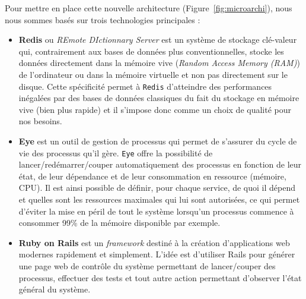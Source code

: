 Pour mettre en place cette nouvelle architecture (Figure~\ref{fig:microarchi}), nous nous sommes basés sur trois technologies principales :
\begin{itemize}
\item \textbf{Redis}\cite{redis} ou \emph{REmote DIctionnary Server} est un système de stockage clé-valeur qui, contrairement aux bases de données plus conventionnelles, stocke les données directement dans la mémoire vive (\emph{Random Access Memory (RAM)}) de l'ordinateur ou dans la mémoire virtuelle et non pas directement sur le disque. Cette spécificité permet à \texttt{Redis} d'atteindre des performances inégalées par des bases de données classiques du fait du stockage en mémoire vive (bien plus rapide) et il s'impose donc comme un choix de qualité pour nos besoins.
\item \textbf{Eye}\cite{eye} est un outil de gestion de processus qui permet de s'assurer du cycle de vie des processus qu'il gère. \texttt{Eye} offre la possibilité de lancer/redémarrer/couper automatiquement des processus en fonction de leur état, de leur dépendance et de leur consommation en ressource (mémoire, CPU). Il est ainsi possible de définir, pour chaque service, de quoi il dépend et quelles sont les ressources maximales qui lui sont autorisées, ce qui permet d'éviter la mise en péril de tout le système lorsqu'un processus commence à consommer 99\% de la mémoire disponible par exemple.
\item \textbf{Ruby on Rails}\cite{rubyrails} est un \emph{framework} destiné à la création d'applications web modernes rapidement et simplement. L'idée est d'utiliser Rails pour générer une page web de contrôle du système permettant de lancer/couper des processus, effectuer des tests et tout autre action permettant d'observer l'état général du système.
\end{itemize}


